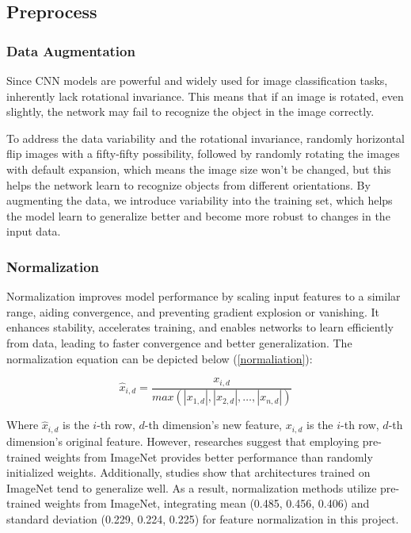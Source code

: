 \documentclass[final,5p,times,twocolumn,sort&compress]{elsarticle}
\begin{document}
\subsection{Preprocess}
\subsubsection{Data Augmentation}
Since CNN models are powerful and widely used for image classification tasks, inherently lack rotational invariance. This means that if an image is rotated, even slightly, the network may fail to recognize the object in the image correctly.

To address the data variability and the rotational invariance,  randomly horizontal flip images with a fifty-fifty possibility, followed by randomly rotating the images with default expansion, which means the image size won't be changed, but this helps the network learn to recognize objects from different orientations. By augmenting the data, we introduce variability into the training set, which helps the model learn to generalize better and become more robust to changes in the input data.

\subsubsection{Normalization}
Normalization improves model performance by scaling input features to a similar range, aiding convergence, and preventing gradient explosion or vanishing. It enhances stability, accelerates training, and enables networks to learn efficiently from data, leading to faster convergence and better generalization. The normalization equation can be depicted below (\ref{normaliation}):

\begin{equation}
    \label{normaliation}
    \hat{x}_{i,d}=\frac{x_{i,d}}{max(|x_{1,d}|, |x_{2,d}|,\dots,|x_{n,d}|)}
\end{equation}

Where $\hat{x}_{i,d}$ is the $i$-th row, $d$-th dimension's new feature, $x_{i,d}$ is the $i$-th row, $d$-th dimension's original feature. However, researches suggest \cite{10.1145/3450439.3451867} \cite{kornblith2019better} that employing pre-trained weights from ImageNet provides better performance than randomly initialized weights. Additionally, studies show that architectures trained on ImageNet tend to generalize well. As a result, normalization methods utilize pre-trained weights from ImageNet, integrating mean (0.485, 0.456, 0.406) and standard deviation (0.229, 0.224, 0.225) for feature normalization in this project.
\end{document}
